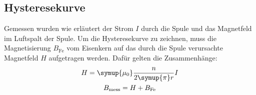 \subsection{Hysteresekurve}
    Gemessen wurden wie erläutert der Strom $I$ durch die Spule und das Magnetfeld im Luftspalt der Spule. 
    Um die Hysteresekurve zu zeichnen, muss die Magnetisierung $B_\text{Fe}$ vom Eisenkern auf das durch die Spule verursachte 
    Magnetfeld $H$ aufgetragen werden. 
    Dafür gelten die Zusammenhänge: %
    \begin{gather}
        H=\symup{\mu_0}\frac{n}{2\symup{\pi}r} I \\
        B_\text{mess} = H+B_\text{Fe}
    \end{gather}

